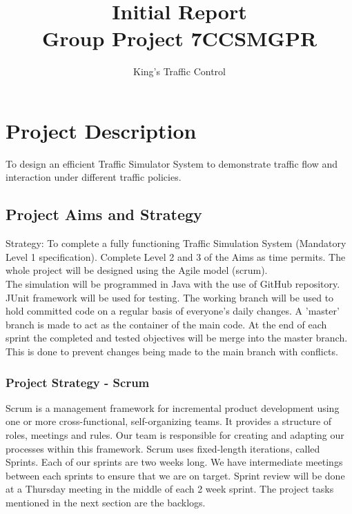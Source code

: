 \documentclass{article} \usepackage{graphicx}
\begin{document}
	
	\title{Initial Report
    \\ Group Project 7CCSMGPR} 	
    \author{King's Traffic Control}
	\maketitle
	
	 \section{Project Description} 		
        To design an efficient Traffic Simulator System to demonstrate traffic flow and interaction under different traffic policies.
        
         \subsection{Project Aims and Strategy}
          Strategy: To complete a fully functioning Traffic Simulation System (Mandatory Level
           1 specification). Complete Level 2 and 3 of the Aims as time permits. The whole project will be designed 
           using the Agile model (scrum). 
           \\The simulation will be programmed in Java with the use of GitHub repository. JUnit framework will be used for testing. 
         The working branch will be used to hold committed code on a regular basis of everyone's daily changes. 
         A 'master' branch is made to act as the container of the main code. At the end of each sprint the completed 
         and tested objectives will be merge into the master branch. This is done to prevent changes being made to the 
         main branch  with conflicts.
			\subsubsection{Project Strategy - Scrum}
			Scrum is a management framework for incremental product development using one or more cross-functional, 
			self-organizing teams. It provides a structure of roles, meetings and rules. Our team is responsible for 
			creating and adapting our processes within this framework. Scrum uses fixed-length iterations, called Sprints. 
			Each of our sprints are two weeks long. We have intermediate meetings between each sprints to ensure that we are on target. 
			Sprint review will be done at a Thursday meeting in the middle of each 2 week sprint. The project tasks mentioned 
			in the next section are the backlogs.
			
\end{document}
